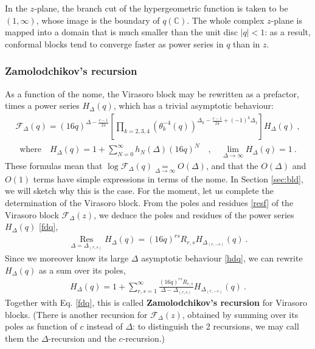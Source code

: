 \documentclass[12pt, a4paper]{article}
\newcommand{\myindex}[1]{\textbf{\boldmath #1}}
\begin{document}
In the $z$-plane, the branch cut of the hypergeometric function is taken to be $(1,\infty)$, whose image is the boundary of $q(\mathbb{C})$. The whole complex $z$-plane is mapped into a domain that is much smaller than the unit disc $|q|<1$: as a result, conformal blocks tend to converge faster as power series in $q$ than in $z$.
 
\subsubsection{Zamolodchikov's recursion}\label{sec:zrr}

As a function of the nome, the Virasoro block 
may be rewritten as a prefactor, times a power series $H_\Delta(q)$, which has a trivial asymptotic behaviour:
\begin{align}
 \boxed{\mathcal{F}_\Delta(q) = (16q)^{\Delta-\frac{c-1}{24}} \left[\prod_{k=2,3,4} \left(\theta_k^{-4}(q)\right)^{\Delta_k-\frac{c-1}{24}+(-1)^k \Delta_1} \right] H_\Delta(q)}\ ,
 \label{fdq}
\end{align}
\begin{align}
 \text{where} \quad \boxed{H_\Delta(q) = 1 + \sum_{N=0}^\infty h_N(\Delta)(16q)^N}  \quad , \quad \boxed{\lim_{\Delta\to\infty} H_\Delta(q) = 1}\ . 
 \label{hdq}
\end{align}
These formulas mean that 
$\log \mathcal{F}_\Delta(q) \underset{\Delta\to\infty}{=} O(\Delta)$, and that the $O(\Delta)$ and $O(1)$ terms have simple expressions in terms of the nome. 
In Section \ref{sec:bld}, we will sketch why this is the case. For the moment, let us complete the determination of the Virasoro block.
From the poles and residues \eqref{resf} of the Virasoro block $\mathcal{F}_\Delta(z)$, we deduce the poles and residues of the power series $H_\Delta(q)$ \eqref{fdq},
\begin{align}
 \underset{\Delta=\Delta_{(r,s)}}{\operatorname{Res}} H_\Delta(q) = (16q)^{rs} R_{r,s}H_{\Delta_{(r,-s)}}(q)\ .
\end{align}
Since we moreover know its large $\Delta$ asymptotic behaviour \eqref{hdq}, we can rewrite $H_\Delta(q)$ as a sum over its poles,
\begin{align}
 \boxed{H_\Delta(q) = 1 + \sum_{r,s=1}^\infty \frac{(16q)^{rs} R_{r,s}}{\Delta-\Delta_{(r,s)}} H_{\Delta_{(r,-s)}}(q)}\ . 
 \label{hrec}
\end{align}
Together with Eq. \eqref{fdq}, this is called \myindex{Zamolodchikov's recursion} for Virasoro blocks. (There is another recursion for $\mathcal{F}_\Delta(z)$, obtained by summing over its poles as function of $c$ instead of $\Delta$: to distinguish the 2 recursions, we may call them the $\Delta$-recursion and the $c$-recursion.)
\end{document}
